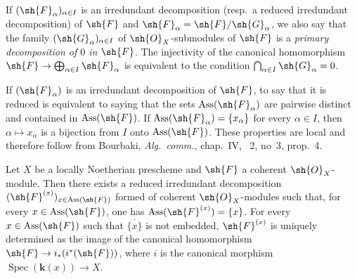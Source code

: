 If $(\sh{F}_\alpha)_{\alpha\in I}$ is an irredundant decomposition (resp.\ a reduced irredundant decomposition) of $\sh{F}$ and $\sh{F}_\alpha=\sh{F}/\sh{G}_\alpha$, we also say that the family $(\sh{G}_\alpha)_{\alpha\in I}$ of $\sh{O}_X$-submodules of $\sh{F}$ is a \emph{primary decomposition of $0$ in $\sh{F}$}.  The injectivity of the canonical homomorphism $\sh{F}\to\bigoplus_{\alpha\in I}\sh{F}_\alpha$ is equivalent to the condition $\bigcap_{\alpha\in I}\sh{G}_\alpha=0$.

If $(\sh{F}_\alpha)$ is an irredundant decomposition of $\sh{F}$, to say that it is reduced is equivalent to saying that the sets $\operatorname{Ass}(\sh{F}_\alpha)$ are pairwise distinct and contained in $\operatorname{Ass}(\sh{F})$.  If $\operatorname{Ass}(\sh{F}_\alpha)=\{x_\alpha\}$ for every $\alpha\in I$, then $\alpha\mapsto x_\alpha$ is a bijection from $I$ onto $\operatorname{Ass}(\sh{F})$.  These properties are local and therefore follow from Bourbaki, \emph{Alg.\ comm.}, chap.~IV, \textsection~2, no~3, prop.~4.

\begin{proposition}[3.2.6]
\label{IV.3.2.6}
Let $X$ be a locally Noetherian prescheme and $\sh{F}$ a coherent $\sh{O}_X$-module.
Then there exists a reduced irredundant decomposition $(\sh{F}^{(x)})_{x\in\operatorname{Ass}(\sh{F})}$ formed of coherent $\sh{O}_X$-modules such that, for every $x\in\operatorname{Ass}(\sh{F})$, one has $\operatorname{Ass}(\sh{F}^{(x)})=\{x\}$.
For every $x\in\operatorname{Ass}(\sh{F})$ such that $\overline{\{x\}}$ is not embedded, $\sh{F}^{(x)}$ is uniquely determined as the image of the canonical homomorphism $\sh{F}\to i_*(i^*(\sh{F}))$, where $i$ is the canonical morphism $\operatorname{Spec}(\boldsymbol{k}(x))\to X$.
\end{proposition}

